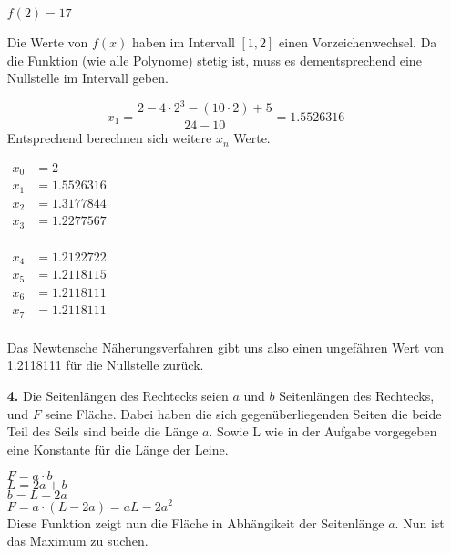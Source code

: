 \documentclass[a4paper,11pt]{scrartcl}
\begin{document}
\begin{enumerate}
        \( f(2) = 17 \)

        Die Werte von $f(x)$ haben im Intervall $[1,2]$ einen Vorzeichenwechsel. Da die Funktion (wie alle Polynome) stetig ist, muss es dementsprechend eine Nullstelle im Intervall geben.

        \[ x_1 = \frac{2 - 4 \cdot 2^3 - (10 \cdot 2) + 5}{24 - 10} = 1.5526316\]
        Entsprechend berechnen sich weitere \(x_n\) Werte.

        \begin{multicols}{2}
            \(\begin{array}{rl}
            x_0 &= 2 \\
            x_1 &= 1.5526316 \\
            x_2 &= 1.3177844 \\
            x_3 &= 1.2277567 \\
            \end{array}\)

            \(\begin{array}{rl}
            x_4 &= 1.2122722 \\
            x_5 &= 1.2118115 \\
            x_6 &= 1.2118111 \\
            x_7 &= 1.2118111 \\
            \end{array}\)
        \end{multicols}

        Das Newtensche Näherungsverfahren gibt uns also einen ungefähren Wert von 1.2118111 für die Nullstelle zurück.

    \item[\textbf{4.}]
        Die Seitenlängen des Rechtecks seien $a$ und $b$ Seitenlängen des Rechtecks, und $F$ seine Fläche.
        Dabei haben die sich gegenüberliegenden Seiten die beide Teil des Seils sind beide die Länge $a$.
        Sowie L wie in der Aufgabe vorgegeben eine Konstante für die Länge der Leine.

        \(F = a \cdot b\) \\
        \(L = 2a + b\) \\
        \(b = L - 2a\) \\
        \(F = a \cdot (L - 2a) = aL - 2a^2\) \\

        Diese Funktion zeigt nun die Fläche in Abhängikeit der Seitenlänge $a$. Nun ist das Maximum zu suchen. \\


\end{enumerate}
\end{document}
